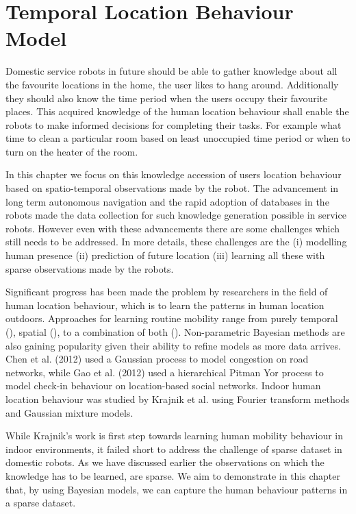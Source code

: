 

\chapter{Temporal Location Behaviour Model}

Domestic service robots in future should be able to gather knowledge about all the favourite locations in the home, the user likes to hang around. Additionally they should also know the time period when the users occupy their favourite places. This acquired knowledge of the human location behaviour shall enable the robots to make informed decisions for completing their tasks. For example what time to clean a particular room based  on least unoccupied time period or when to turn on the heater of the room. 

In this chapter we focus on this knowledge accession of users location behaviour based on spatio-temporal observations made by the robot. The advancement in long term autonomous navigation  and the rapid adoption of databases in the robots  made the data collection for such knowledge generation possible in service robots. However even with these advancements there are some challenges which still needs to be addressed.  In more details, these challenges are the (i) modelling human presence (ii) prediction of future location (iii) learning all these with sparse observations made by the robots. 

Significant progress has been made the problem by researchers in the field of human location behaviour, which is to learn the patterns in human location outdoors. Approaches for learning routine mobility  range from purely temporal (\cite{c1, c2}), spatial (\cite{c5,c3}), to a combination  of  both  (\cite{c4}). Non-parametric Bayesian methods are also gaining popularity given their ability to refine models as more data arrives. Chen et al. (2012) used a Gaussian process to model congestion on road networks, while Gao et al. (2012) used a hierarchical Pitman Yor process to model check-in behaviour on location-based social networks. Indoor human location behaviour was studied by Krajnik et al.  using Fourier transform methods and Gaussian mixture models. 

While Krajnik's  work is first step towards learning human mobility behaviour in indoor environments, it failed short to address the challenge of sparse dataset in domestic robots. As we have discussed earlier the observations on which the knowledge has to be learned, are sparse. We aim to demonstrate in this chapter that, by using Bayesian models, we can capture the human behaviour patterns in a sparse dataset.

